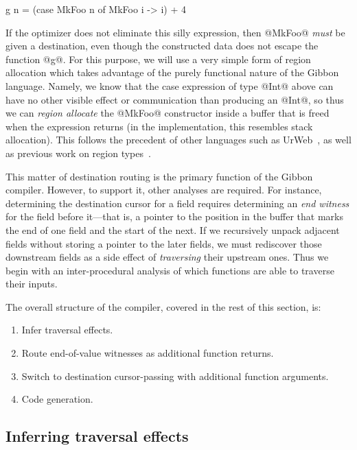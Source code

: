 \documentclass[a4paper,english]{lipics-v2016}
\newcommand{\treelang}{Gibbon\xspace} %
\newif\ifcurly
\newcommand{\finishmecurly}{\ifcurly \Red{FINISHME - do ifcurly version here} \else}
\begin{document}
\finishmecurly
\begin{code}
  g n = (case MkFoo n of MkFoo i -> i) + 4
\end{code}
\fi

If the optimizer does not eliminate this silly expression, then @MkFoo@ {\em
  must} be given a destination, even though the constructed data does not escape
the function @g@.  For this purpose, we will use a very simple form of region
allocation which takes advantage of the purely functional nature of the
\treelang language.  Namely, we know that the case expression of type @Int@
above can have no other visible effect or communication than producing an @Int@,
so thus we can {\em region allocate} the @MkFoo@ constructor inside a buffer
that is freed when the expression returns (in the implementation, this resembles
stack allocation).  This follows the precedent of other languages such as
UrWeb~\cite{urweb}, as well as previous work on region
types~\cite{mlkit,cyclone}.


This matter of destination routing is the primary function of the \treelang
compiler.  However, to support it, other analyses are required.  For instance,
determining the destination cursor for a field requires determining an {\em end
  witness} for the field before it---that is, a pointer to the position in the
buffer that marks the end of one field and the start of the next.  If we
recursively unpack adjacent fields without storing a pointer to the later
fields, we must rediscover those downstream fields as a side effect of
{\em traversing} their upstream ones.  Thus we begin with an inter-procedural
analysis of which functions are able to traverse their inputs.

The overall structure of the compiler, covered in the rest of this
section, is:
\begin{enumerate}
\item Infer traversal effects.
\item Route end-of-value witnesses as additional function returns.
\item Switch to destination cursor-passing with additional function arguments.
\item Code generation.
\end{enumerate}


\subsection{Inferring traversal effects}
\end{document}
